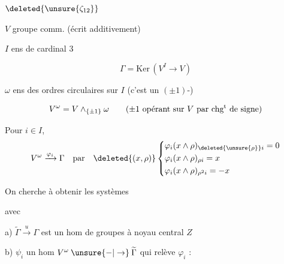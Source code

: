 $\deleted{\unsure{\zeta_{12}}}$

$V$ groupe comm. (écrit additivement)

$I$ ens de cardinal 3

\[
 \Gamma=\mathrm{Ker}\,(V^I\to V)
\]

$\omega$ ens des  ordres circulaires sur $I$ (c'est un $(\pm1)$-)

\[
 V^\omega=V\mathbin{\wedge}_{\{\pm1\}}\omega
 \qquad(\pm1\text{ opérant sur }V\text{ par chg}\textsuperscript{t}\text{ de signe})
\]

Pour $i\in I$, \unsure{---}
\[
 V^\omega\xrightarrow{\varphi_i}\Gamma\quad\text{par}\quad\deleted{(x,\rho)}
 \left\{\begin{aligned}
 &\varphi_i(x\wedge\rho)_{\deleted{\unsure{\rho}}i}=0\\
 &\varphi_i(x\wedge\rho)_{\rho i}=x\\
 &\varphi_i(x\wedge\rho)_{\rho^2 i}=-x
 \end{aligned}\right.
\]


On cherche à obtenir les systèmes



avec

 a) $\widetilde\Gamma\xrightarrow{u}\Gamma$ est un hom de groupes à noyau central $Z$

b) $\psi_i$ un hom $V^\omega\mathbin{\unsure{-|\to}}\widetilde\Gamma$ qui relève $\varphi_i$ :

